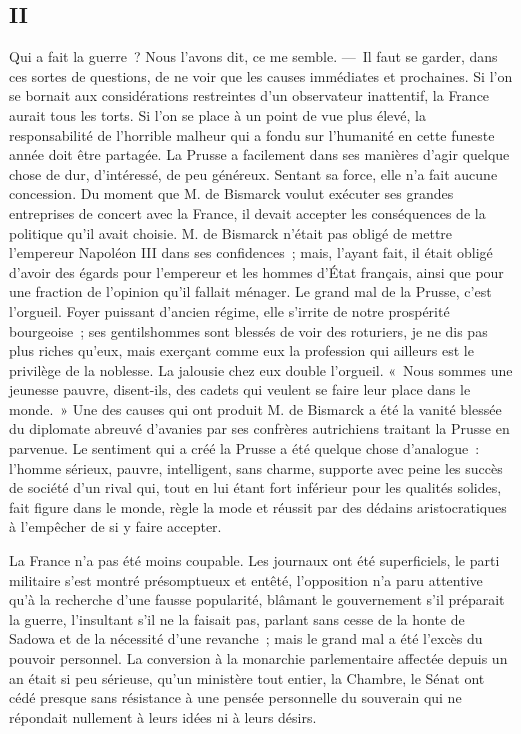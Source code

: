 \documentclass[french,twoside]{book} %
\begin{document}
\subsection[{II}]{II}
\noindent Qui a fait la guerre ? Nous l’avons dit, ce me semble. — Il faut se garder, dans ces sortes de questions, de ne voir que les causes immédiates et prochaines. Si l’on se bornait aux considérations restreintes d’un observateur inattentif, la France aurait tous les torts. Si l’on se place à un point de vue plus élevé, la responsabilité de l’horrible malheur qui a fondu sur l’humanité en cette funeste année doit être partagée. La Prusse a facilement dans ses manières d’agir quelque chose de dur, d’intéressé, de peu généreux. Sentant sa force, elle n’a fait aucune concession. Du moment que M. de Bismarck voulut exécuter ses grandes entreprises de concert avec la France, il devait accepter les conséquences de la politique qu’il avait choisie. M. de Bismarck n’était pas obligé de mettre l’empereur Napoléon III dans ses confidences ; mais, l’ayant fait, il était obligé d’avoir des égards pour l’empereur et les hommes d’État français, ainsi que pour une fraction de l’opinion qu’il fallait ménager. Le grand mal de la Prusse, c’est l’orgueil. Foyer puissant d’ancien régime, elle s’irrite de notre prospérité bourgeoise ; ses gentilshommes sont blessés de voir des roturiers, je ne dis pas plus riches qu’eux, mais exerçant comme eux la profession qui ailleurs est le privilège de la noblesse. La jalousie chez eux double l’orgueil. « Nous sommes une jeunesse pauvre, disent-ils, des cadets qui veulent se faire leur place dans le monde. » Une des causes qui ont produit M. de Bismarck a été la vanité blessée du diplomate abreuvé d’avanies par ses confrères autrichiens traitant la Prusse en parvenue. Le sentiment qui a créé la Prusse a été quelque chose d’analogue : l’homme sérieux, pauvre, intelligent, sans charme, supporte avec peine les succès de société d’un rival qui, tout en lui étant fort inférieur pour les qualités solides, fait figure dans le monde, règle la mode et réussit par des dédains aristocratiques à l’empêcher de si y faire accepter.\par
La France n’a pas été moins coupable. Les journaux ont été superficiels, le parti militaire s’est montré présomptueux et entêté, l’opposition n’a paru attentive qu’à la recherche d’une fausse popularité, blâmant le gouvernement s’il préparait la guerre, l’insultant s’il ne la faisait pas, parlant sans cesse de la honte de Sadowa et de la nécessité d’une revanche ; mais le grand mal a été l’excès du pouvoir personnel. La conversion à la monarchie parlementaire affectée depuis un an était si peu sérieuse, qu’un ministère tout entier, la Chambre, le Sénat ont cédé presque sans résistance à une pensée personnelle du souverain qui ne répondait nullement à leurs idées ni à leurs désirs.\par
\end{document}
